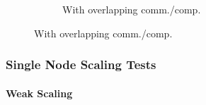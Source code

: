 \begin{frame}
\begin{figure}
\begin{subfigure}{0.41\textwidth}
      \caption{With overlapping comm./comp.}
      \label{FIG:Benchmark:Hybrid_1}
    \end{subfigure}
    \label{FIG:Benchmark:Hybrid}
  \end{figure}
\end{frame}

\begin{frame}
  \frametitle{Single Node Scaling Tests}
  \framesubtitle{Weak Scaling}


\end{frame}
